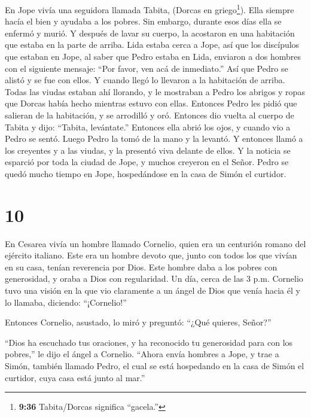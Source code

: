  En Jope vivía una seguidora llamada Tabita, (Dorcas en
griego\footnote{\textbf{9:36} Tabita/Dorcas significa ``gacela.''}).
Ella siempre hacía el bien y ayudaba a los pobres.  Sin
embargo, durante esos días ella se enfermó y murió. Y después de lavar
su cuerpo, la acostaron en una habitación que estaba en la parte de
arriba.  Lida estaba cerca a Jope, así que los discípulos
que estaban en Jope, al saber que Pedro estaba en Lida, enviaron a dos
hombres con el siguiente mensaje: ``Por favor, ven acá de inmediato.''
 Así que Pedro se alistó y se fue con ellos. Y cuando llegó
lo llevaron a la habitación de arriba. Todas las viudas estaban ahí
llorando, y le mostraban a Pedro los abrigos y ropas que Dorcas había
hecho mientras estuvo con ellas.  Entonces Pedro les pidió
que salieran de la habitación, y se arrodilló y oró. Entonces dio vuelta
al cuerpo de Tabita y dijo: ``Tabita, levántate.'' Entonces ella abrió
los ojos, y cuando vio a Pedro se sentó.  Luego Pedro la
tomó de la mano y la levantó. Y entonces llamó a los creyentes y a las
viudas, y la presentó viva delante de ellos.  Y la noticia
se esparció por toda la ciudad de Jope, y muchos creyeron en el Señor.
 Pedro se quedó mucho tiempo en Jope, hospedándose en la
casa de Simón el curtidor.

\hypertarget{section-9}{%
\section{10}\label{section-9}}

 En Cesarea vivía un hombre llamado Cornelio, quien era un
centurión romano del ejército italiano.  Este era un hombre
devoto que, junto con todos los que vivían en su casa, tenían reverencia
por Dios. Este hombre daba a los pobres con generosidad, y oraba a Dios
con regularidad.  Un día, cerca de las 3 p.m. Cornelio tuvo
una visión en la que vio claramente a un ángel de Dios que venía hacia
él y lo llamaba, diciendo: ``¡Cornelio!''

 Entonces Cornelio, asustado, lo miró y preguntó: ``¿Qué
quieres, Señor?''

``Dios ha escuchado tus oraciones, y ha reconocido tu generosidad para
con los pobres,'' le dijo el ángel a Cornelio.  ``Ahora
envía hombres a Jope, y trae a Simón, también llamado Pedro,
 el cual se está hospedando en la casa de Simón el curtidor,
cuya casa está junto al mar.''

